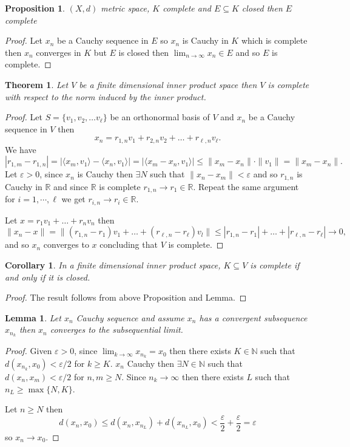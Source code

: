 \documentclass[11pt,openany]{book}
\theoremstyle{plain}
\newtheorem{theorem}{Theorem}[chapter]
\newtheorem{lemma}{Lemma}[chapter]
\newtheorem{corollary}{Corollary}[chapter]
\newtheorem{proposition}{Proposition}[chapter]
\theoremstyle{definition}
\theoremstyle{remark}
\newcommand{\R}{\mathbb{R}}
\newcommand{\N}{\mathbb{N}}
\newcommand{\eps}{\varepsilon}
\begin{document}
\begin{proposition}
    $(X,d)$ metric space, $K$ complete and $E \subseteq K$ closed then $E$ complete
\end{proposition}

\begin{proof}
    Let $x_n$ be a Cauchy sequence in $E$ so $x_n$ is Cauchy in $K$ which is complete then $x_n$ converges in $K$ but $E$ is closed then $\lim_{n\to \infty}x_n \in E$ and so $E$ is complete.
\end{proof}

\begin{theorem}
    Let $V$ be a finite dimensional inner product space then $V$ is complete with respect to the norm induced by the inner product.
\end{theorem}
\begin{proof}
    Let $S = \{v_1,v_2, \dots v_{\ell}\}$ be an orthonormal basis of $V$ and $x_n$ be a Cauchy sequence in $V$ then $$x_n = r_{1,n}v_1 + r_{2,n}v_2+ \dots + r_{\ell,n}v_{\ell}.$$ We have 
    $$|r_{1,m} - r_{1,n}| = | \langle x_m, v_1 \rangle - \langle x_n, v_1 \rangle | = |\langle x_m - x_n, v_1 \rangle| \le  \|x_m - x_n\| \cdot \|v_1\|=\|x_m-x_n\|.$$ 
    Let $\eps > 0$, since $x_n$ is Cauchy then $\exists N$ such that $\|x_n - x_m\| < \eps$ and so $r_{1,n}$ is Cauchy in $ \R$ and since $\R$ is complete $r_{1,n} \to r_1 \in \R$. 
    Repeat the same argument for $i=1,\cdots,\ell$ we get $r_{i,n} \to r_i \in \R$. 
    
    Let $x= r_1v_1+ \dots +r_nv_n$ then $$\|x_n-x\| = \|(r_{1,n} -r_1)v_1 + \dots + (r_{\ell,n} - r_{\ell})v_l\| \le |r_{1,n}-r_1|  + \dots + |r_{\ell,n} - r_{\ell}|\to 0,$$
    and so $x_n$ converges to $x$ concluding that $V$
 is complete.
 \end{proof}

\begin{corollary}\label{eq:fdcomplete}
In a finite dimensional inner product space,
$K \subseteq V$ is complete if and only if it is closed.
\end{corollary}
\begin{proof}
    The result follows from above Proposition and Lemma.
\end{proof}
\begin{lemma}
      Let $x_n$ Cauchy sequence and assume $x_n$ has a convergent subsequence $x_{n_k}$ then $x_n$ converges to the subsequential limit.
\end{lemma}

\begin{proof}
     Given $ \eps > 0$, since $\lim_{k \to \infty} x_{n_k} = x_0$ then there exists $K \in \N$ such that $d(x_{n_k}, x_0) < \eps/2$ for $k \ge K$. $x_n$ Cauchy then $\exists N \in \N$ such that $d(x_n,x_m) < \eps/2$ for $n,m \ge N$. 
     Since $n_k\to \infty$ then there exists $L$ such that $n_L\geq \max\{N,K\}$.
     
     Let $n \ge N$ then \[d(x_n, x_0) \le d(x_n, x_{n_L}) + d(x_{n_L}, x_0) < \frac{\eps}{2} + \frac{\eps}{2} = \eps\] so $x_n \to x_0$.
\end{proof}
\end{document}
